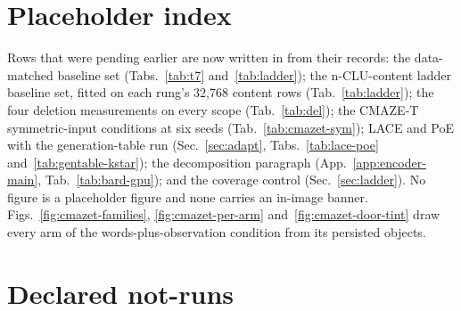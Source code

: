 \documentclass{article} %
\begin{document}
\section{Placeholder index}
\label{app:placeholders}

Rows
that were pending earlier are now written in from their records: the data-matched baseline set
(Tabs.~\ref{tab:t7} and~\ref{tab:ladder}); the n-CLU-content ladder baseline set, fitted on each rung's
32,768 content rows (Tab.~\ref{tab:ladder}); the four deletion measurements on every scope %
(Tab.~\ref{tab:del}); the CMAZE-T symmetric-input conditions at six seeds
(Tab.~\ref{tab:cmazet-sym}); LACE and PoE with the generation-table run (Sec.~\ref{sec:adapt},
Tabs.~\ref{tab:lace-poe} and~\ref{tab:gentable-kstar}); the decomposition paragraph
(App.~\ref{app:encoder-main}, Tab.~\ref{tab:bard-gpu}); and the coverage control
(Sec.~\ref{sec:ladder}). No figure is a placeholder figure and none carries an in-image banner.
Figs.~\ref{fig:cmazet-families}, \ref{fig:cmazet-per-arm}
and~\ref{fig:cmazet-door-tint} draw every arm of the words-plus-observation condition from its
persisted objects.

\section{Declared not-runs}
\label{app:notrun}
\end{document}
